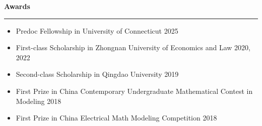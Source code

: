 \documentclass[a4paper,10pt]{article}
\newcommand{\resheading}[1]{
  \vspace{8pt}
  \noindent\textbf{\large #1}
  \vspace{4pt}
  \hrule
  \vspace{8pt}
}
\begin{document}
\resheading{Awards}
\begin{itemize}[left=0pt, label={}, itemsep=-8pt]
   \item Predoc Fellowship in University of Connecticut \hfill 2025 \\ 
   \item First-class Scholarship in Zhongnan University of Economics and Law \hfill 2020, 2022 \\
   \item Second-class Scholarship in Qingdao University \hfill 2019  \\
   \item First Prize in China Contemporary Undergraduate Mathematical Contest in Modeling \hfill 2018  \\
   \item First Prize in China Electrical Math Modeling Competition \hfill 2018  \\
\end{itemize}
\end{document}

